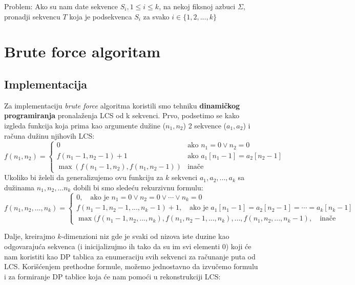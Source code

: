 \documentclass{article}
\begin{document}
    {\large Problem}: Ako su nam date sekvence $S_i, 1 \leq i \leq k$, na nekoj fiksnoj azbuci $\Sigma$, pronadji sekvencu $T$ koja je podsekvenca $S_i$ za svako $i \in \{1,2,...,k\}$


    \section{Brute force algoritam}

    \subsection{Implementacija}
    Za implementaciju \emph{brute force} algoritma koristili smo tehniku \textbf{dinamičkog programiranja} pronalaženja LCS od k sekvenci. Prvo, podsetimo se kako izgleda funkcija koja prima kao argumente dužine ($n_1, n_2$) 2 sekvence ($a_1,a_2$) i računa dužinu njihovih LCS:
    $$ f(n_1, n_2) =
    \begin{cases}
        0 & \text{ako } n_1 = 0 \lor n_2 = 0 \\
        f(n_1-1,n_2-1)+1 & \text{ako } a_1[n_1 - 1] = a_2[n_2 - 1] \\
        \max{(f(n_1-1,n_2), f(n_1,n_2-1))} & \text{inače}
    \end{cases}
    $$
    Ukoliko bi želeli da generalizujemo ovu funkciju za $k$ sekvenci $a_1,a_2,...,a_k$ sa dužinama $n_1, n_2,...n_k$ dobili bi smo sledeću rekurzivnu formulu:
    $$ f(n_1, n_2, ...,n_k) =
    \begin{cases}
        0, \hspace{1em}  \text{ako je } n_1 = 0 \lor n_2 = 0 \lor \cdots \lor n_k = 0 \\
        f(n_1-1,n_2-1,...,n_k-1)+1, \hspace{1em} \text{ako je } a_1[n_1 - 1] = a_2[n_2 - 1] = \cdots = a_k[n_k-1] \\
        \max{(f(n_1-1,n_2,...,n_k), f(n_1,n_2-1,...,n_k), ..., f(n_1,n_2,...,n_k-1)}, \hspace{1em} \text{inače}
    \end{cases}
    $$

    \vspace{7em}

    Dalje, kreirajmo $k$-dimenzioni niz gde je svaki od nizova iste duzine kao odgovarajuća sekvenca (i inicijalizujmo ih tako da su im svi elementi 0) koji će nam koristiti kao DP tablica za enumeraciju svih sekvenci za računanje puta od LCS. Korišćenjem prethodne formule, možemo jednostavno da izvučemo formulu i za formiranje DP tablice koja će nam pomoći u rekonstrukciji LCS:
\end{document}
